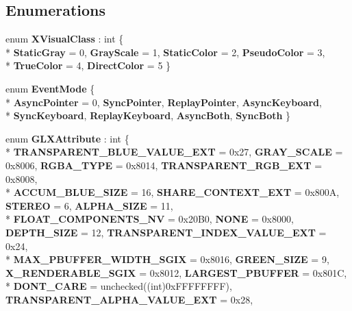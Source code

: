 \subsection*{Enumerations}
\begin{DoxyCompactItemize}
\item 
enum {\bfseries X\-Visual\-Class} \-: int \{ \\*
{\bfseries Static\-Gray} = 0, 
{\bfseries Gray\-Scale} = 1, 
{\bfseries Static\-Color} = 2, 
{\bfseries Pseudo\-Color} = 3, 
\\*
{\bfseries True\-Color} = 4, 
{\bfseries Direct\-Color} = 5
 \}
\item 
enum {\bfseries Event\-Mode} \{ \\*
{\bfseries Async\-Pointer} = 0, 
{\bfseries Sync\-Pointer}, 
{\bfseries Replay\-Pointer}, 
{\bfseries Async\-Keyboard}, 
\\*
{\bfseries Sync\-Keyboard}, 
{\bfseries Replay\-Keyboard}, 
{\bfseries Async\-Both}, 
{\bfseries Sync\-Both}
 \}
\item 
enum {\bfseries G\-L\-X\-Attribute} \-: int \{ \\*
{\bfseries T\-R\-A\-N\-S\-P\-A\-R\-E\-N\-T\-\_\-\-B\-L\-U\-E\-\_\-\-V\-A\-L\-U\-E\-\_\-\-E\-X\-T} = 0x27, 
{\bfseries G\-R\-A\-Y\-\_\-\-S\-C\-A\-L\-E} = 0x8006, 
{\bfseries R\-G\-B\-A\-\_\-\-T\-Y\-P\-E} = 0x8014, 
{\bfseries T\-R\-A\-N\-S\-P\-A\-R\-E\-N\-T\-\_\-\-R\-G\-B\-\_\-\-E\-X\-T} = 0x8008, 
\\*
{\bfseries A\-C\-C\-U\-M\-\_\-\-B\-L\-U\-E\-\_\-\-S\-I\-Z\-E} = 16, 
{\bfseries S\-H\-A\-R\-E\-\_\-\-C\-O\-N\-T\-E\-X\-T\-\_\-\-E\-X\-T} = 0x800\-A, 
{\bfseries S\-T\-E\-R\-E\-O} = 6, 
{\bfseries A\-L\-P\-H\-A\-\_\-\-S\-I\-Z\-E} = 11, 
\\*
{\bfseries F\-L\-O\-A\-T\-\_\-\-C\-O\-M\-P\-O\-N\-E\-N\-T\-S\-\_\-\-N\-V} = 0x20\-B0, 
{\bfseries N\-O\-N\-E} = 0x8000, 
{\bfseries D\-E\-P\-T\-H\-\_\-\-S\-I\-Z\-E} = 12, 
{\bfseries T\-R\-A\-N\-S\-P\-A\-R\-E\-N\-T\-\_\-\-I\-N\-D\-E\-X\-\_\-\-V\-A\-L\-U\-E\-\_\-\-E\-X\-T} = 0x24, 
\\*
{\bfseries M\-A\-X\-\_\-\-P\-B\-U\-F\-F\-E\-R\-\_\-\-W\-I\-D\-T\-H\-\_\-\-S\-G\-I\-X} = 0x8016, 
{\bfseries G\-R\-E\-E\-N\-\_\-\-S\-I\-Z\-E} = 9, 
{\bfseries X\-\_\-\-R\-E\-N\-D\-E\-R\-A\-B\-L\-E\-\_\-\-S\-G\-I\-X} = 0x8012, 
{\bfseries L\-A\-R\-G\-E\-S\-T\-\_\-\-P\-B\-U\-F\-F\-E\-R} = 0x801\-C, 
\\*
{\bfseries D\-O\-N\-T\-\_\-\-C\-A\-R\-E} = unchecked((int)0x\-F\-F\-F\-F\-F\-F\-F\-F), 
{\bfseries T\-R\-A\-N\-S\-P\-A\-R\-E\-N\-T\-\_\-\-A\-L\-P\-H\-A\-\_\-\-V\-A\-L\-U\-E\-\_\-\-E\-X\-T} = 0x28, 

\end{DoxyCompactItemize}
